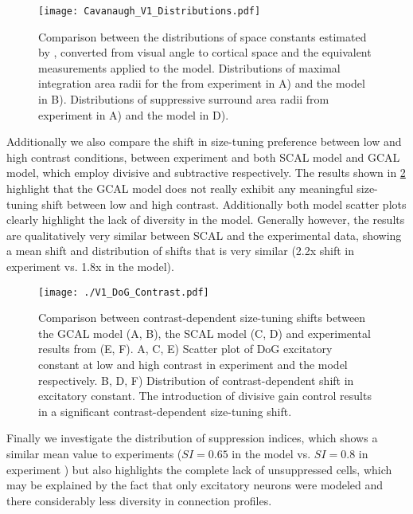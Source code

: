 \begin{figure}
	\centering
        \texttt{[image: Cavanaugh\_V1\_Distributions.pdf]}
	\caption[Distribution of V1 Difference-of-Gaussian space constants
      measured by \cite{Cavanaugh2002} compared to SCAL
      model.]{Comparison between the distributions of space constants
      estimated by \cite{Cavanaugh2002}, converted from visual angle
      to cortical space and the equivalent measurements applied to the
      model. Distributions of maximal integration area radii for the
      from experiment in A) and the model in B). Distributions of
      suppressive surround area radii from experiment in A) and the
      model in D).}
	\label{CavanaughDistribution}
\end{figure}

Additionally we also compare the shift in size-tuning preference
between low and high contrast conditions, between experiment
\citep{Sceniak1999} and both SCAL model and GCAL model, which employ
divisive and subtractive respectively. The results shown in
\ref{ContrastShift} highlight that the GCAL model does not really
exhibit any meaningful size-tuning shift between low and high
contrast. Additionally both model scatter plots clearly highlight the
lack of diversity in the model. Generally however, the results are
qualitatively very similar between SCAL and the experimental data,
showing a mean shift and distribution of shifts that is very similar
(2.2x shift in experiment vs. 1.8x in the model).

\begin{figure}
	\centering
        \texttt{[image: ./V1\_DoG\_Contrast.pdf]}
	\caption[Contrast-dependent size-tuning shifts compared between
      GCAL, SCAL and experimental results from
      \cite{Sceniak1999}.]{Comparison between contrast-dependent
      size-tuning shifts between the GCAL model (A, B), the SCAL model
      (C, D) and experimental results from \cite{Sceniak1999} (E,
      F). A, C, E) Scatter plot of DoG excitatory constant at low and
      high contrast in experiment and the model respectively. B, D, F)
      Distribution of contrast-dependent shift in excitatory
      constant. The introduction of divisive gain control results in a
      significant contrast-dependent size-tuning shift.}
	\label{ContrastShift}
\end{figure}

Finally we investigate the distribution of suppression indices, which
shows a similar mean value to experiments ($SI=0.65$ in the model
vs. $SI=0.8$ in experiment \citep{Sceniak2006}) but also highlights
the complete lack of unsuppressed cells, which may be explained by the
fact that only excitatory neurons were modeled and there considerably
less diversity in connection profiles.

